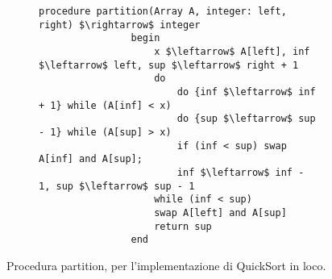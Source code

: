 \documentclass{subfiles}
\begin{document}
\begin{figure}[!h]
    \centering
    \begin{subfigure}[b]{0.75\textwidth}
        \begin{lstlisting}[language = algol]
            procedure partition(Array A, integer: left, right) $\rightarrow$ integer
                begin
                    x $\leftarrow$ A[left], inf $\leftarrow$ left, sup $\leftarrow$ right + 1
                    do
                        do {inf $\leftarrow$ inf + 1} while (A[inf] < x)
                        do {sup $\leftarrow$ sup - 1} while (A[sup] > x)
                        if (inf < sup) swap A[inf] and A[sup];
                        inf $\leftarrow$ inf - 1, sup $\leftarrow$ sup - 1
                    while (inf < sup)
                    swap A[left] and A[sup]
                    return sup
                end
        \end{lstlisting}
    \end{subfigure}
    \caption{Procedura partition, per l'implementazione di QuickSort in loco.}
    \label{Fig:4.7}
\end{figure}
\end{document}
